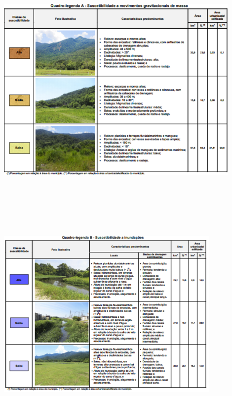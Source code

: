 	\begin{landscape}
		\begin{minipage}[b]{0.5\linewidth}
			\includegraphics[width=12cm,height=12cm,keepaspectratio]{img/quadroA_suscetibilidade.png}
			\label{quadroA_susce}
		\end{minipage}
		\begin{minipage}[b]{0.5\linewidth}
			\includegraphics[width=11cm,height=11cm,keepaspectratio]{img/quadroB_suscetibilidade.png}
			\label{quadroB_susce}
		\end{minipage}
	\end{landscape}

